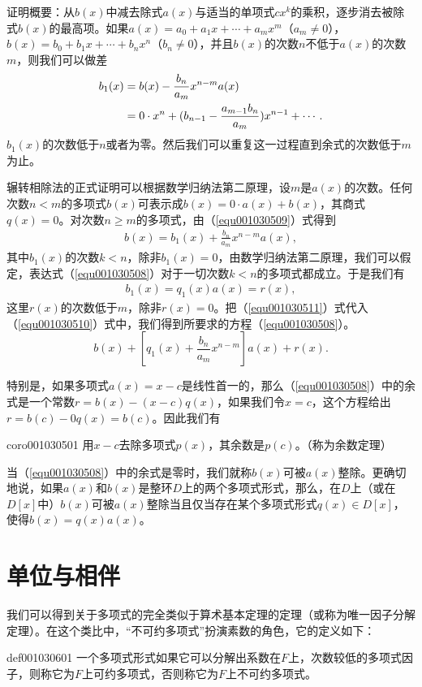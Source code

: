 证明概要：从$b(x)$中减去除式$a(x)$与适当的单项式$cx^k$的乘积，逐步消去被除式$b(x)$的最高项。如果$a(x)=a_0+a_1x+\cdots+a_mx^m$（$a_m \neq 0$），$b(x)=b_0+b_1x+\cdots+b_nx^n$（$b_n \neq 0$），并且$b(x)$的次数$n$不低于$a(x)$的次数$m$，则我们可以做差
\begin{align}
b_1(x) &= b(x) - \frac{b_n}{a_m}x^{n-m}a(x) \notag \\
&= 0 \cdot x^n + (b_{n-1} - \frac{a_{m-1}b_n}{a_m})x^{n-1} + \cdots. \label{equ001030509}
\end{align}
$b_1(x)$的次数低于$n$或者为零。然后我们可以重复这一过程直到余式的次数低于$m$为止。

辗转相除法的正式证明可以根据数学归纳法第二原理，设$m$是$a(x)$的次数。任何次数$n < m$的多项式$b(x)$可表示成$b(x)=0 \cdot a(x)+b(x)$，其商式$q(x)=0$。对次数$n \ge m$的多项式，由（\ref{equ001030509}）式得到
\begin{gather}\label{equ001030510}
b(x) = b_1(x) + \frac{b_n}{a_m}x^{n-m}a(x),
\end{gather}
其中$b_1(x)$的次数$k < n$，除非$b_1(x)=0$，由数学归纳法第二原理，我们可以假定，表达式（\ref{equ001030508}）对于一切次数$k<n$的多项式都成立。于是我们有
\begin{gather}\label{equ001030511}
b_1(x) = q_1(x)a(x) = r(x),
\end{gather}
这里$r(x)$的次数低于$m$，除非$r(x)=0$。把（\ref{equ001030511}）式代入（\ref{equ001030510}）式中，我们得到所要求的方程（\ref{equ001030508}）。
\[
b(x) + [q_1(x) + \frac{b_n}{a_m}x^{n-m}]a(x) + r(x).
\]

特别是，如果多项式$a(x)=x-c$是线性首一的，那么（\ref{equ001030508}）中的余式是一个常数$r = b(x) - (x-c)q(x)$，如果我们令$x = c$，这个方程给出$r = b(c) - 0q(x) = b(c)$。因此我们有
\begin{corollary}{}{coro001030501}
用$x-c$去除多项式$p(x)$，其余数是$p(c)$。（称为余数定理）
\end{corollary}

当（\ref{equ001030508}）中的余式是零时，我们就称$b(x)$可被$a(x)$整除。更确切地说，如果$a(x)$和$b(x)$是整环$D$上的两个多项式形式，那么，在$D$上（或在$D[x]$中）$b(x)$可被$a(x)$整除当且仅当存在某个多项式形式$q(x) \in D[x]$，使得$b(x)=q(x)a(x)$。


\section{单位与相伴}\label{subsection0010306}
我们可以得到关于多项式的完全类似于算术基本定理的定理（或称为唯一因子分解定理）。在这个类比中，“不可约多项式”扮演素数的角色，它的定义如下：
\begin{definition}{}{def001030601}
一个多项式形式如果它可以分解出系数在$F$上，次数较低的多项式因子，则称它为$F$上可约多项式，否则称它为$F$上不可约多项式。
\end{definition}

